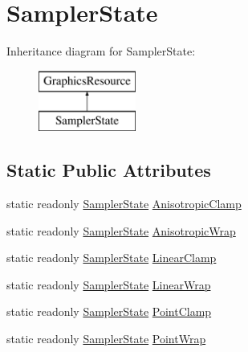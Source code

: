 \hypertarget{classMicrosoft_1_1Xna_1_1Framework_1_1Graphics_1_1SamplerState}{}\section{Sampler\+State}
\label{classMicrosoft_1_1Xna_1_1Framework_1_1Graphics_1_1SamplerState}
Inheritance diagram for Sampler\+State\+:\begin{figure}[H]
\begin{center}
\leavevmode
\includegraphics[height=2.000000cm]{classMicrosoft_1_1Xna_1_1Framework_1_1Graphics_1_1SamplerState}
\end{center}
\end{figure}
\subsection*{Static Public Attributes}
\begin{DoxyCompactItemize}
\item 
static readonly \hyperlink{classMicrosoft_1_1Xna_1_1Framework_1_1Graphics_1_1SamplerState}{Sampler\+State} \hyperlink{classMicrosoft_1_1Xna_1_1Framework_1_1Graphics_1_1SamplerState_a464f9834c101447be268b00e4a4358b3}{Anisotropic\+Clamp}
\item 
static readonly \hyperlink{classMicrosoft_1_1Xna_1_1Framework_1_1Graphics_1_1SamplerState}{Sampler\+State} \hyperlink{classMicrosoft_1_1Xna_1_1Framework_1_1Graphics_1_1SamplerState_a72c2012eec008f173514c6778e462b7e}{Anisotropic\+Wrap}
\item 
static readonly \hyperlink{classMicrosoft_1_1Xna_1_1Framework_1_1Graphics_1_1SamplerState}{Sampler\+State} \hyperlink{classMicrosoft_1_1Xna_1_1Framework_1_1Graphics_1_1SamplerState_a85656739cdfa709af1f2424a260631bb}{Linear\+Clamp}
\item 
static readonly \hyperlink{classMicrosoft_1_1Xna_1_1Framework_1_1Graphics_1_1SamplerState}{Sampler\+State} \hyperlink{classMicrosoft_1_1Xna_1_1Framework_1_1Graphics_1_1SamplerState_a800b0abf764f29968b48836c5dc80e12}{Linear\+Wrap}
\item 
static readonly \hyperlink{classMicrosoft_1_1Xna_1_1Framework_1_1Graphics_1_1SamplerState}{Sampler\+State} \hyperlink{classMicrosoft_1_1Xna_1_1Framework_1_1Graphics_1_1SamplerState_ad06d1af034c24c263c583024333f0755}{Point\+Clamp}
\item 
static readonly \hyperlink{classMicrosoft_1_1Xna_1_1Framework_1_1Graphics_1_1SamplerState}{Sampler\+State} \hyperlink{classMicrosoft_1_1Xna_1_1Framework_1_1Graphics_1_1SamplerState_a2c02632e089d295d8f1cb5d6448c9353}{Point\+Wrap}
\end{DoxyCompactItemize}
